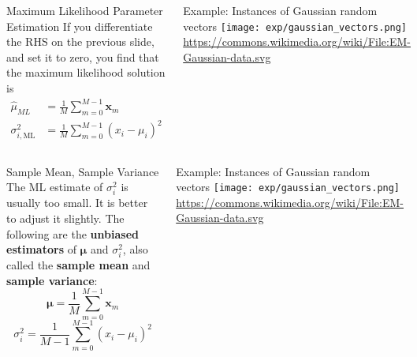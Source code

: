 \documentclass{beamer}
\begin{document}
\begin{frame}
  \begin{columns}
    \column{2.25in}
    \begin{block}{Maximum Likelihood Parameter Estimation}
      If you differentiate the RHS on the previous slide, and set it
      to zero, you find that the maximum likelihood solution is
      \begin{align*}
        \hat{\mu}_{ML} &= \frac{1}{M}\sum_{m=0}^{M-1}\mathbf{x}_m\\
        \sigma^2_{i,\text{ML}} &= \frac{1}{M}\sum_{m=0}^{M-1}(x_i-\mu_i)^2
      \end{align*}
    \end{block}
    \column{2in}
    \begin{block}{Example: Instances of Gaussian random vectors}
      \texttt{[image: exp/gaussian\_vectors.png]}
      {\footnotesize\url{https://commons.wikimedia.org/wiki/File:EM-Gaussian-data.svg}}
    \end{block}
  \end{columns}
\end{frame}

\begin{frame}
  \begin{columns}
    \column{2.25in}
    \begin{block}{Sample Mean, Sample Variance}
      The ML estimate of $\sigma_i^2$ is usually too small.  It is better
      to adjust it slightly.  The following are the {\bf unbiased
        estimators} of $\bm{\mu}$ and $\sigma_i^2$, also called the {\bf
        sample mean} and {\bf sample variance}:
      \[
      \bm{\mu}=\frac{1}{M}\sum_{m=0}^{M-1}\mathbf{x}_m
      \]
      \[
      \sigma_i^2=\frac{1}{M-1}\sum_{m=0}^{M-1}(x_i-\mu_i)^2
      \]
    \end{block}
    \column{2in}
    \begin{block}{Example: Instances of Gaussian random vectors}
      \texttt{[image: exp/gaussian\_vectors.png]}
      {\footnotesize\url{https://commons.wikimedia.org/wiki/File:EM-Gaussian-data.svg}}
    \end{block}
  \end{columns}
\end{frame}
\end{document}
